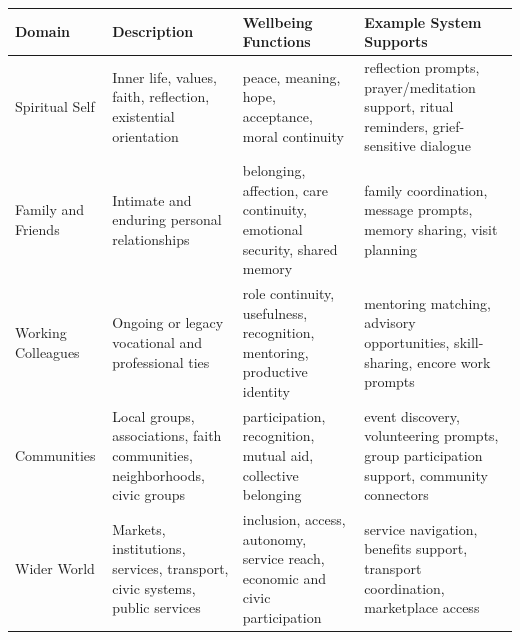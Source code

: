 \documentclass[
  journal,
]{IEEEtran}%
\newcounter{none} %
\begin{document}
{\def\LTcaptype{none} %
\begin{longtable}[]{@{}
  >{\raggedright\arraybackslash}p{}
  >{\raggedright\arraybackslash}p{}
  >{\raggedright\arraybackslash}p{}
  >{\raggedright\arraybackslash}p{}@{}}
\toprule\noalign{}
\begin{minipage}[b]{\linewidth}\raggedright
Domain
\end{minipage} & \begin{minipage}[b]{\linewidth}\raggedright
Description
\end{minipage} & \begin{minipage}[b]{\linewidth}\raggedright
Wellbeing Functions
\end{minipage} & \begin{minipage}[b]{\linewidth}\raggedright
Example System Supports
\end{minipage} \\
\midrule\noalign{}
\endhead
\bottomrule\noalign{}
\endlastfoot
Spiritual Self & Inner life, values, faith, reflection, existential
orientation & peace, meaning, hope, acceptance, moral continuity &
reflection prompts, prayer/meditation support, ritual reminders,
grief-sensitive dialogue \\
Family and Friends & Intimate and enduring personal relationships &
belonging, affection, care continuity, emotional security, shared memory
& family coordination, message prompts, memory sharing, visit
planning \\
Working Colleagues & Ongoing or legacy vocational and professional ties
& role continuity, usefulness, recognition, mentoring, productive
identity & mentoring matching, advisory opportunities, skill-sharing,
encore work prompts \\
Communities & Local groups, associations, faith communities,
neighborhoods, civic groups & participation, recognition, mutual aid,
collective belonging & event discovery, volunteering prompts, group
participation support, community connectors \\
Wider World & Markets, institutions, services, transport, civic systems,
public services & inclusion, access, autonomy, service reach, economic
and civic participation & service navigation, benefits support,
transport coordination, marketplace access \\
\end{longtable}
}
\end{document}
